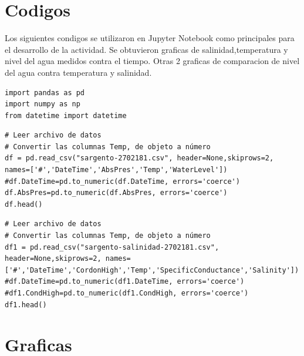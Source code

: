 \documentclass{article}
\begin{document}
\section{Codigos}
Los siguientes condigos se utilizaron en Jupyter Notebook como principales para el desarrollo de la actividad. Se obtuvieron graficas de salinidad,temperatura y nivel del agua medidos contra el tiempo. Otras 2 graficas de comparacion de nivel del agua contra temperatura y salinidad.
\begin{verbatim}
import pandas as pd
import numpy as np
from datetime import datetime
\end{verbatim}
\begin{verbatim}
# Leer archivo de datos
# Convertir las columnas Temp, de objeto a número
df = pd.read_csv("sargento-2702181.csv", header=None,skiprows=2, names=['#','DateTime','AbsPres','Temp','WaterLevel'])
#df.DateTime=pd.to_numeric(df.DateTime, errors='coerce')
df.AbsPres=pd.to_numeric(df.AbsPres, errors='coerce')
df.head()
\end{verbatim}
\begin{verbatim}
# Leer archivo de datos
# Convertir las columnas Temp, de objeto a número
df1 = pd.read_csv("sargento-salinidad-2702181.csv", header=None,skiprows=2, names=['#','DateTime','CordonHigh','Temp','SpecificConductance','Salinity'])
#df.DateTime=pd.to_numeric(df1.DateTime, errors='coerce')
#df1.CondHigh=pd.to_numeric(df1.CondHigh, errors='coerce')
df1.head()
\end{verbatim}
\section{Graficas}
\end{document}
